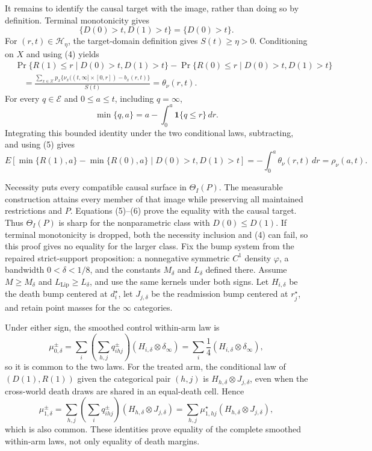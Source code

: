 It remains to identify the causal target with the image, rather than doing so by definition.  Terminal monotonicity gives
\[
\{D(0)>t,D(1)>t\}=\{D(0)>t\}.                                      \tag{4}
\]
For \((r,t)\in\mathcal H_\eta\), the target-domain definition gives \(S(t)\geq\eta>0\).  Conditioning on \(X\) and using (4) yields
\[
\begin{aligned}
&\Pr\{R(1)\leq r\mid D(0)>t,D(1)>t\}
-\Pr\{R(0)\leq r\mid D(0)>t,D(1)>t\}\\
&\quad=\frac{\sum_{x\in\mathcal X}p_x
\{\nu_x((t,\infty]\times[0,r])-b_x(r,t)\}}{S(t)}
=\theta_\nu(r,t).                                                    \tag{5}
\end{aligned}
\]
For every \(q\in\mathcal E\) and \(0\leq a\leq t\), including \(q=\infty\),
\[
\min\{q,a\}=a-\int_0^a\mathbf 1\{q\leq r\}\,dr.
\]
Integrating this bounded identity under the two conditional laws, subtracting, and using (5) gives
\[
E[\min\{R(1),a\}-\min\{R(0),a\}\mid D(0)>t,D(1)>t]
=-\int_0^a\theta_\nu(r,t)\,dr
=\rho_\nu(a,t).                                                       \tag{6}
\]

Necessity puts every compatible causal surface in \(\Theta_I(P)\).  The measurable construction attains every member of that image while preserving all maintained restrictions and \(P\).  Equations (5)--(6) prove the equality with the causal target.  Thus \(\Theta_I(P)\) is sharp for the nonparametric class with \(D(0)\leq D(1)\).  If terminal monotonicity is dropped, both the necessity inclusion and (4) can fail, so this proof gives no equality for the larger class.
Fix the bump system from the repaired strict-support proposition: a nonnegative symmetric \(C^1\) density \(\varphi\), a bandwidth \(0<\delta<1/8\), and the constants \(M_\delta\) and \(L_\delta\) defined there.  Assume \(M\geq M_\delta\) and \(L_{\mathrm{Lip}}\geq L_\delta\), and use the same kernels under both signs.  Let \(H_{i,\delta}\) be the death bump centered at \(d_i^\star\), let \(J_{j,\delta}\) be the readmission bump centered at \(r_j^\star\), and retain point masses for the \(\infty\) categories.

Under either sign, the smoothed control within-arm law is
\[
\mu_{0,\delta}^{\pm}
=\sum_i\left(\sum_{h,j}q^\pm_{ihj}\right)
(H_{i,\delta}\otimes\delta_\infty)
=\sum_i\frac14(H_{i,\delta}\otimes\delta_\infty),                  \tag{39}
\]
so it is common to the two laws.  For the treated arm, the conditional law of \((D(1),R(1))\) given the categorical pair \((h,j)\) is \(H_{h,\delta}\otimes J_{j,\delta}\), even when the cross-world death draws are shared in an equal-death cell.  Hence
\[
\mu_{1,\delta}^{\pm}
=\sum_{h,j}\left(\sum_iq^\pm_{ihj}\right)
(H_{h,\delta}\otimes J_{j,\delta})
=\sum_{h,j}\mu_{1,hj}^\star
(H_{h,\delta}\otimes J_{j,\delta}),                                \tag{40}
\]
which is also common.  These identities prove equality of the complete smoothed within-arm laws, not only equality of death margins.

